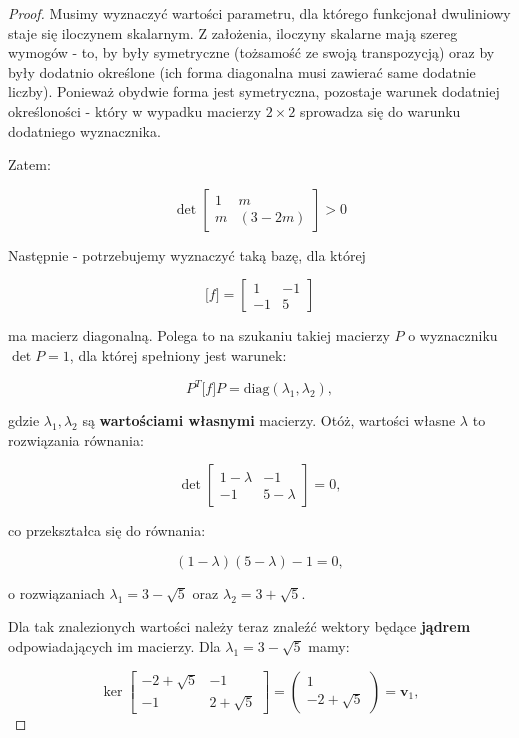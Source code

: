 \documentclass[11pt]{article}
\theoremstyle{definition}
\begin{document}
\begin{proof}
Musimy wyznaczyć wartości parametru, dla którego funkcjonał dwuliniowy staje się iloczynem skalarnym. Z założenia, iloczyny skalarne mają szereg wymogów - to, by były symetryczne (tożsamość ze swoją transpozycją) oraz by były dodatnio określone (ich forma diagonalna musi zawierać same dodatnie liczby). Ponieważ obydwie forma jest symetryczna, pozostaje warunek dodatniej określoności - który w wypadku macierzy $2\times2$ sprowadza się do warunku dodatniego wyznacznika.

Zatem:

$$\det\begin{bmatrix}
    1&m\\
    m&(3-2m)
\end{bmatrix} > 0$$

Następnie - potrzebujemy wyznaczyć taką bazę, dla której 

$$\big[f\big] = \begin{bmatrix}
    1&-1\\
    -1&5
\end{bmatrix}$$

ma macierz diagonalną. Polega to na szukaniu takiej macierzy $P$ o wyznaczniku $\det P=1$, dla której spełniony jest warunek:

$$P^T\big[f\big]P = \text{diag}(\lambda_1, \lambda_2),$$

gdzie $\lambda_1, \lambda_2$ są \textbf{wartościami własnymi} macierzy. Otóż, wartości własne $\lambda$ to rozwiązania równania:

$$\det\begin{bmatrix}
    1-\lambda&-1\\
    -1&5-\lambda
\end{bmatrix} = 0,$$

co przekształca się do równania:

$$(1-\lambda)(5-\lambda)-1=0,$$

o rozwiązaniach $\lambda_1 = 3-\sqrt{5}$ oraz $\lambda_2 = 3+\sqrt{5}$.

Dla tak znalezionych wartości należy teraz znaleźć wektory będące \textbf{jądrem} odpowiadających im macierzy. Dla $\lambda_1=3-\sqrt{5}$ mamy:

$$\ker\begin{bmatrix}-2+\sqrt5 & -1\\-1&2+\sqrt5\end{bmatrix} = \begin{pmatrix}1\\-2+\sqrt{5}\end{pmatrix} = \mathbf v_1,$$


\end{proof}
\end{document}
